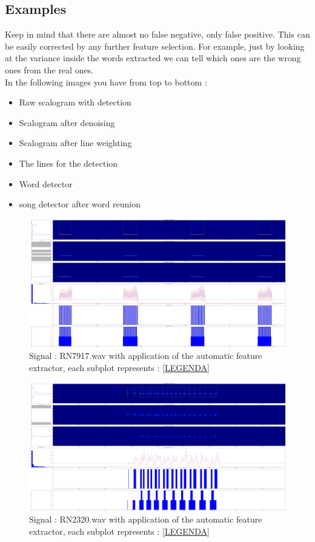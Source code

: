 \documentclass[a4paper]{report}
\begin{document}
\subsection{Examples}
Keep in mind that there are almost no false negative, only false positive. This can be easily corrected by any further feature selection. For example, just by looking at the variance inside the words extracted we can tell which ones are the wrong ones from the real ones.\\
In the following images you have from top to bottom :

\begin{itemize}\label{LEGENDA}
\item Raw scalogram with detection
\item Scalogram after denoising
\item Scalogram after line weighting
\item The lines for the detection
\item Word detector
\item song detector after word reunion
\end{itemize}

\begin{figure}[H]
\begin{center}
\includegraphics[scale=0.07]{1test.png}\caption{Signal : RN7917.wav with application of the automatic feature extractor, each subplot represents : \ref{LEGENDA} }
\end{center}
\end{figure}


\begin{figure}[H]
\begin{center}
\includegraphics[scale=0.07]{2test.png}\caption{Signal : RN2320.wav with application of the automatic feature extractor, each subplot represents : \ref{LEGENDA} }
\end{center}
\end{figure}
\end{document}
